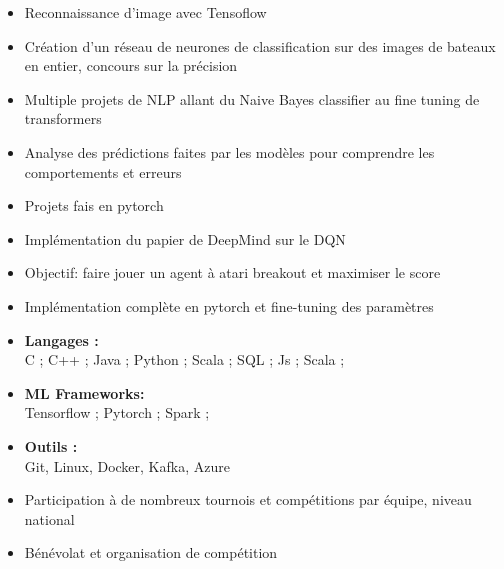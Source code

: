 \documentclass[10pt,a4paper,ragged2e,withhyper]{altacv}
\begin{document}
\begin{paracol}{2}
\divider

\begin{itemize}
    \item Reconnaissance d'image avec Tensoflow
    \item Création d'un réseau de neurones de classification sur des images de bateaux en entier, concours sur la précision
\end{itemize}

\divider

\begin{itemize}
    \item Multiple projets de NLP allant du Naive Bayes classifier au fine tuning de transformers
    \item Analyse des prédictions faites par les modèles pour comprendre les comportements et erreurs
    \item Projets fais en pytorch
\end{itemize}

\divider
{}
\begin{itemize}
    \item Implémentation du papier de DeepMind sur le DQN
    \item Objectif: faire jouer un agent à atari breakout et maximiser le score
    \item Implémentation complète en pytorch et fine-tuning des paramètres
\end{itemize}

\begin{itemize}
    \item \textbf{Langages :} \\
            C ; C++ ; Java ; Python ; Scala ; SQL ; Js ; Scala ;
    \item \textbf{ML Frameworks:}\\
            Tensorflow ; Pytorch ; Spark ;
    \item \textbf{Outils :} \\
            Git, Linux, Docker, Kafka, Azure
\end{itemize}

\begin{itemize}
    \item Participation à de nombreux tournois et compétitions par équipe, niveau national
    \item Bénévolat et organisation de compétition

\end{itemize}

\end{paracol}
\end{document}
